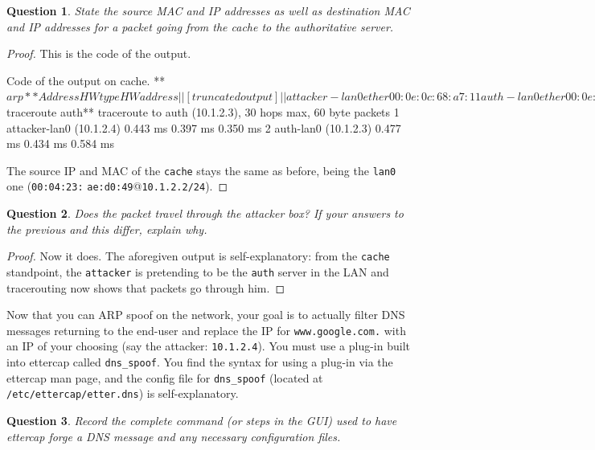 \documentclass[a4paper,11pt,hidelinks]{article}
\newtheorem{theorem}{Question}[subsection]
\begin{document}
\begin{theorem}
    State the source MAC and IP addresses as well as destination MAC and IP addresses for a packet going from the cache to the authoritative server.
\end{theorem}

\begin{proof}
    This is the code of the output.

\begin{code}{Code of the output on cache.}
**$ arp**
Address                  HWtype  HWaddress         
||[truncated output]||
attacker-lan0            ether   00:0e:0c:68:a7:11
auth-lan0                ether   00:0e:0c:68:a7:11

**$ traceroute auth**
traceroute to auth (10.1.2.3), 30 hops max, 60 byte packets
 1  attacker-lan0 (10.1.2.4)  0.443 ms  0.397 ms  0.350 ms
 2  auth-lan0 (10.1.2.3)  0.477 ms  0.434 ms  0.584 ms
\end{code}

    The source IP and MAC of the \verb=cache= stays the same as before, being the \verb=lan0= one (\verb=00:04:23:= \verb=ae:d0:49=@\verb=10.1.2.2/24=).
\end{proof}

\begin{theorem}
    Does the packet travel through the attacker box? If your answers to the previous and this differ, explain why.
\end{theorem}

\begin{proof}
    Now it does. The aforegiven output is self-explanatory: from the \verb=cache= standpoint, the \verb=attacker= is pretending to be the \verb=auth= server in the LAN and tracerouting now shows that packets go through him. 
\end{proof}

Now that you can ARP spoof on the network, your goal is to actually filter DNS messages returning to the end-user and replace the IP for \verb=www.google.com.= with an IP of your choosing (say the attacker: \verb=10.1.2.4=). You must use a plug-in built into ettercap called \verb=dns_spoof=.  You find the syntax for using a plug-in via the ettercap man page, and the config file for \verb=dns_spoof= (located at \verb=/etc/ettercap/etter.dns=) is self-explanatory.

\begin{theorem}
    Record the complete command (or steps in the GUI) used to have ettercap forge a DNS message and any necessary configuration files.
\end{theorem}
\end{document}
